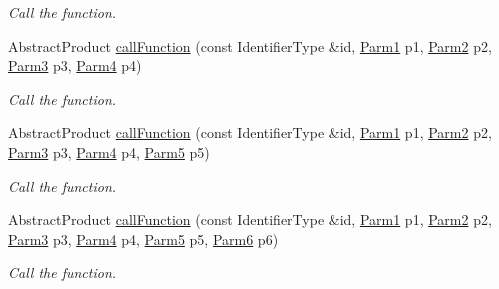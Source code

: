 \begin{DoxyCompactItemize}
\begin{DoxyCompactList}\small\item\em Call the function. \end{DoxyCompactList}\item 
Abstract\+Product \mbox{\hyperlink{classUtil_1_1FunctionMap_a824e671873a79866e30b503f1794cfbf}{call\+Function}} (const Identifier\+Type \&id, \mbox{\hyperlink{classUtil_1_1FunctionMap_a7b842c0101fae8075e8b21c90ede63cb}{Parm1}} p1, \mbox{\hyperlink{classUtil_1_1FunctionMap_a46a76423783c6a8dcc4442ffb8cf54a4}{Parm2}} p2, \mbox{\hyperlink{classUtil_1_1FunctionMap_a4578d42cd0723beba85654aa774d0145}{Parm3}} p3, \mbox{\hyperlink{classUtil_1_1FunctionMap_a912703c1f39a6e219b2449183e48fb07}{Parm4}} p4)
\begin{DoxyCompactList}\small\item\em Call the function. \end{DoxyCompactList}\item 
Abstract\+Product \mbox{\hyperlink{classUtil_1_1FunctionMap_a4f66b55ae4a6c3c82813ee1364faeae9}{call\+Function}} (const Identifier\+Type \&id, \mbox{\hyperlink{classUtil_1_1FunctionMap_a7b842c0101fae8075e8b21c90ede63cb}{Parm1}} p1, \mbox{\hyperlink{classUtil_1_1FunctionMap_a46a76423783c6a8dcc4442ffb8cf54a4}{Parm2}} p2, \mbox{\hyperlink{classUtil_1_1FunctionMap_a4578d42cd0723beba85654aa774d0145}{Parm3}} p3, \mbox{\hyperlink{classUtil_1_1FunctionMap_a912703c1f39a6e219b2449183e48fb07}{Parm4}} p4, \mbox{\hyperlink{classUtil_1_1FunctionMap_a993589d5b721f73c7905377e24dbf9f4}{Parm5}} p5)
\begin{DoxyCompactList}\small\item\em Call the function. \end{DoxyCompactList}\item 
Abstract\+Product \mbox{\hyperlink{classUtil_1_1FunctionMap_ad7318d634f90f1f5cb0e78359c56c405}{call\+Function}} (const Identifier\+Type \&id, \mbox{\hyperlink{classUtil_1_1FunctionMap_a7b842c0101fae8075e8b21c90ede63cb}{Parm1}} p1, \mbox{\hyperlink{classUtil_1_1FunctionMap_a46a76423783c6a8dcc4442ffb8cf54a4}{Parm2}} p2, \mbox{\hyperlink{classUtil_1_1FunctionMap_a4578d42cd0723beba85654aa774d0145}{Parm3}} p3, \mbox{\hyperlink{classUtil_1_1FunctionMap_a912703c1f39a6e219b2449183e48fb07}{Parm4}} p4, \mbox{\hyperlink{classUtil_1_1FunctionMap_a993589d5b721f73c7905377e24dbf9f4}{Parm5}} p5, \mbox{\hyperlink{classUtil_1_1FunctionMap_ae121f4a5c3534a888db59d6702a15b40}{Parm6}} p6)
\begin{DoxyCompactList}\small\item\em Call the function. \end{DoxyCompactList}\end{DoxyCompactItemize}


